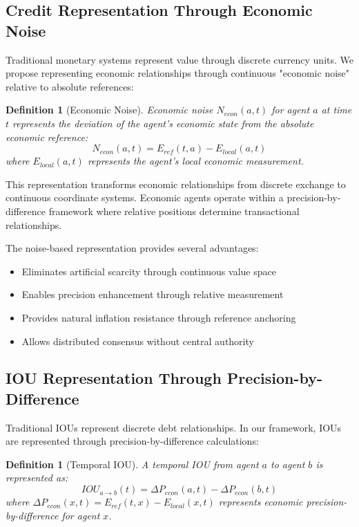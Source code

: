 \documentclass[12pt,a4paper]{article}
\newtheorem{definition}[theorem]{Definition}
\begin{document}
\subsection{Credit Representation Through Economic Noise}

Traditional monetary systems represent value through discrete currency units. We propose representing economic relationships through continuous "economic noise" relative to absolute references:

\begin{definition}[Economic Noise]
Economic noise $N_{econ}(a,t)$ for agent $a$ at time $t$ represents the deviation of the agent's economic state from the absolute economic reference:
\begin{equation}
N_{econ}(a,t) = E_{ref}(t,a) - E_{local}(a,t)
\end{equation}
where $E_{local}(a,t)$ represents the agent's local economic measurement.
\end{definition}

This representation transforms economic relationships from discrete exchange to continuous coordinate systems. Economic agents operate within a precision-by-difference framework where relative positions determine transactional relationships.

The noise-based representation provides several advantages:
\begin{itemize}
\item Eliminates artificial scarcity through continuous value space
\item Enables precision enhancement through relative measurement
\item Provides natural inflation resistance through reference anchoring
\item Allows distributed consensus without central authority
\end{itemize}

\subsection{IOU Representation Through Precision-by-Difference}

Traditional IOUs represent discrete debt relationships. In our framework, IOUs are represented through precision-by-difference calculations:

\begin{definition}[Temporal IOU]
A temporal IOU from agent $a$ to agent $b$ is represented as:
\begin{equation}
IOU_{a \rightarrow b}(t) = \Delta P_{econ}(a,t) - \Delta P_{econ}(b,t)
\end{equation}
where $\Delta P_{econ}(x,t) = E_{ref}(t,x) - E_{local}(x,t)$ represents economic precision-by-difference for agent $x$.
\end{definition}
\end{document}
